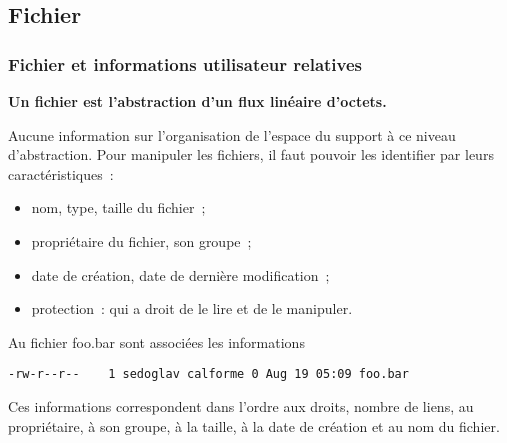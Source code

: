 \subsection{Fichier}
\begin{frame}[fragile]
  \frametitle{Fichier et informations utilisateur relatives}%
  \begin{center}
    {\bf Un fichier est l'abstraction d'un flux lin\'eaire d'octets.}
  \end{center}
  \par
  Aucune information sur l'organisation de  l'espace du support \`a ce
  niveau d'abstraction.   Pour manipuler les  fichiers, il  faut 
  pouvoir les identifier par leurs caract\'eristiques~:
  \begin{itemize}
  \item nom, type, taille du fichier~;
  \item propri\'etaire du fichier, son groupe~;
  \item date de cr\'eation, date de derni\`ere modification~;
  \item protection~: qui a droit de le lire et de le manipuler.
  \end{itemize}
  Au fichier foo.bar sont associ\'ees les informations
\begin{verbatim}
-rw-r--r--    1 sedoglav calforme 0 Aug 19 05:09 foo.bar
\end{verbatim}
  Ces informations correspondent dans l'ordre aux droits, nombre de
  liens, au propri\'etaire, \`a son groupe, \`a la taille, \`a la date
  de cr\'eation et au nom du fichier.
\end{frame}
